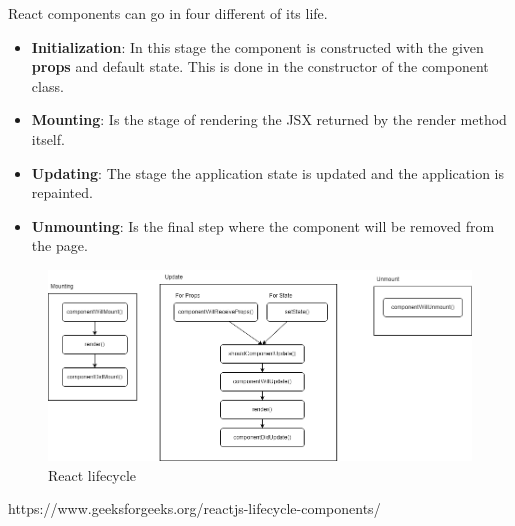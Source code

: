 React components can go in four different of its life. 

\begin{itemize}
    \item \textbf{Initialization}: In this stage the component is constructed with the given \textbf{props} and default state. 
    This is done in the constructor of the component class. 
    \item \textbf{Mounting}: Is the stage of rendering the JSX returned by the render method itself.
    \item \textbf{Updating}: The stage the application state is updated and the application is repainted. 
    \item \textbf{Unmounting}: Is the final step where the component will be removed from the page. 
\end{itemize}



\begin{figure}[h]
\centering
\includegraphics[width=1\linewidth]{figures/01_lifecycle.png}
\caption{React lifecycle}
\label{fig:lifecycle}
\end{figure}

https://www.geeksforgeeks.org/reactjs-lifecycle-components/

